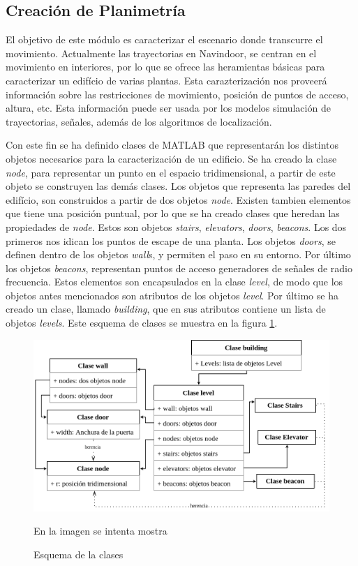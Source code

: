 
\subsection{Creación de Planimetría}

El objetivo de este módulo es caracterizar el escenario donde transcurre el movimiento. Actualmente las trayectorias en Navindoor, se centran en el movimiento en interiores, por lo que se ofrece las heramientas básicas para caracterizar un edifício de varias plantas. Esta carazterización nos proveerá información sobre las restricciones de movimiento, posición de puntos de acceso, altura, etc. Esta información puede ser usada por los modelos simulación de trayectorias, señales, además de los algoritmos de localización.

Con este fin se ha definido clases de MATLAB que representarán los distintos objetos necesarios para la caracterización de un edificio. Se ha creado la clase \emph{node}, para representar un punto en el espacio tridimensional, a partir de este objeto se construyen las demás clases. Los objetos que representa las paredes del edifício, son construidos a partir de dos objetos \emph{node}. Existen tambien elementos que tiene una posición puntual, por lo que se ha creado clases que heredan las propiedades de \emph{node}. Estos son objetos \emph{stairs}, \emph{elevators}, \emph{doors}, \emph{beacons}. Los dos primeros nos idican los puntos de escape de una planta. Los objetos \emph{doors}, se definen dentro de los objetos \emph{wall}s, y permiten el paso en su entorno. Por último los objetos \emph{beacons}, representan puntos de acceso generadores de señales de radio frecuencia. Estos elementos son encapsulados en la clase \emph{level}, de modo que los objetos antes mencionados son atributos de los objetos \emph{level}. Por último se ha creado un clase, llamado \emph{building}, que en sus atributos contiene un lista de objetos \emph{levels}. Este esquema de clases se muestra en la figura \ref{fig:esquemabuilding}.

\begin{figure}[!ht]
    \centering
    \includegraphics[width=1.05     \columnwidth]{img/Design/planimetria.png} 
    \caption[]{Esquema de la clases }
    \footnotesize
    En la imagen se intenta mostra 
    \label{fig:esquemabuilding}
\end{figure}  


